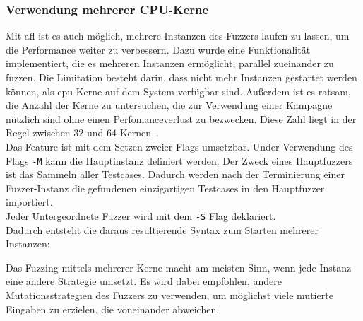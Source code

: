 \subsubsection{Verwendung mehrerer CPU-Kerne}
Mit \gls{afl} ist es auch möglich, mehrere Instanzen des Fuzzers laufen zu lassen, um die Performance weiter zu verbessern.
Dazu wurde eine Funktionalität implementiert, die es mehreren Instanzen ermöglicht, parallel zueinander zu fuzzen.
Die Limitation besteht darin, dass nicht mehr Instanzen gestartet werden können, als \gls{cpu}-Kerne auf dem System verfügbar
sind.
Außerdem ist es ratsam, die Anzahl der Kerne zu untersuchen, die zur Verwendung einer Kampagne nützlich sind ohne einen
Perfomanceverlust zu bezwecken.
Diese Zahl liegt in der Regel zwischen 32 und 64 Kernen~\cite{afl-multiple-cores}.\\
\linebreak
Das Feature ist mit dem Setzen zweier Flags umsetzbar.
Under Verwendung des Flags \texttt{-M} kann die Hauptinstanz definiert werden.
Der Zweck eines Hauptfuzzers ist das Sammeln aller Testcases.
Dadurch werden nach der Terminierung einer Fuzzer-Instanz die gefundenen einzigartigen Testcases in den Hauptfuzzer importiert.\\
Jeder Untergeordnete Fuzzer wird mit dem \texttt{-S} Flag deklariert.\\
Dadurch entsteht die daraus resultierende Syntax zum Starten mehrerer Instanzen:


Das Fuzzing mittels mehrerer Kerne macht am meisten Sinn, wenn jede Instanz eine andere Strategie umsetzt.
Es wird dabei empfohlen, andere Mutationsstrategien des Fuzzers zu verwenden, um möglichst viele mutierte Eingaben zu
erzielen, die voneinander abweichen.
